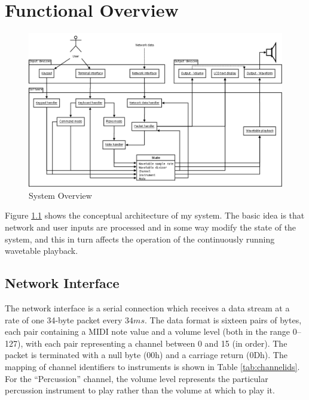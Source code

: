 \chapter{Functional Overview}

\begin{nowordcount}
\begin{figure}[htbp]
\centering
\includegraphics[width=0.95\textheight,angle=90]{images/overview}
\caption{System Overview}\label{fig:systemoverview}
\end{figure}
\end{nowordcount}

Figure \ref{fig:systemoverview} shows the conceptual architecture of my system.  The basic idea is 
that network and user inputs are processed and in some way modify the state of the system, and this 
in turn affects the operation of the continuously running wavetable playback.

\section{Network Interface}
\label{sec:overview:network}

The network interface is a serial connection which receives a data stream at a rate of one 34-byte 
packet every $34ms$.  The data format is sixteen pairs of bytes, each pair containing a MIDI note 
value and a volume level (both in the range 0--127), with each pair representing a channel between 0 
and 15 (in order).  The packet is terminated with a null byte (00h) and a carriage return (0Dh).  
The mapping of channel identifiers to instruments is shown in Table \ref{tab:channelids}.  For the 
``Percussion'' channel, the volume level represents the particular percussion instrument to play 
rather than the volume at which to play it.

